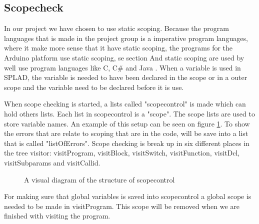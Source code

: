 \subsection{Scopecheck}
\label{sec:scopecheck}
In our project we have chosen to use static scoping. Because the program languages that is made in the project group is a imperative program languages, where it make more sense that it have static scoping, the programs for the Arduino platform use static scoping, se section %
And static scoping are used by well use program languages like C, C\# and Java \citep{ProgrammingCommunityIndex}.
When a variable is used in SPLAD, the variable is needed to have been declared in the scope or in a outer scope and the variable need to be declared before it is use.

When scope checking is started, a lists called "scopecontrol" is made which can hold others lists. Each list in scopecontrol is a "scope". The scope lists are used to store variable names. An example of this setup can be seen on figure \ref{fig:scopediagram}. To show the errors that are relate to scoping that are in the code, will be save into a list that is called "listOfErrors". Scope checking is break up in six different places in the tree visitor: visitProgram, visitBlock, visitSwitch, visitFunction, visitDcl, visitSubparams and visitCallid.

\begin{figure}[H]

\centering
{}
\caption{A visual diagram of the structure of scopecontrol}
\label{fig:scopediagram}
\end{figure}

For making sure that global variables is saved into scopecontrol a global scope is needed to be made in visitProgram. This scope will be removed when we are finished with visiting the program.


